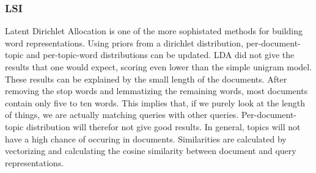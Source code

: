 \subsubsection{LSI}
Latent Dirichlet Allocation is one of the more sophistated methods for building word representations. Using priors from a dirichlet distribution, per-document-topic and per-topic-word distributions can be updated. LDA did not give the results that one would expect, scoring even lower than the simple unigram model.
These results can be explained by the small length of the documents. After removing the stop words and lemmatizing the remaining words, most documents contain only five to ten words. This implies that, if we purely look at the length of things, we are actually matching queries with other queries. Per-document-topic distribution will therefor not give good results. In general, topics will not have a high chance of occuring in documents.
Similarities are calculated by vectorizing and calculating the cosine similarity between document and query representations.